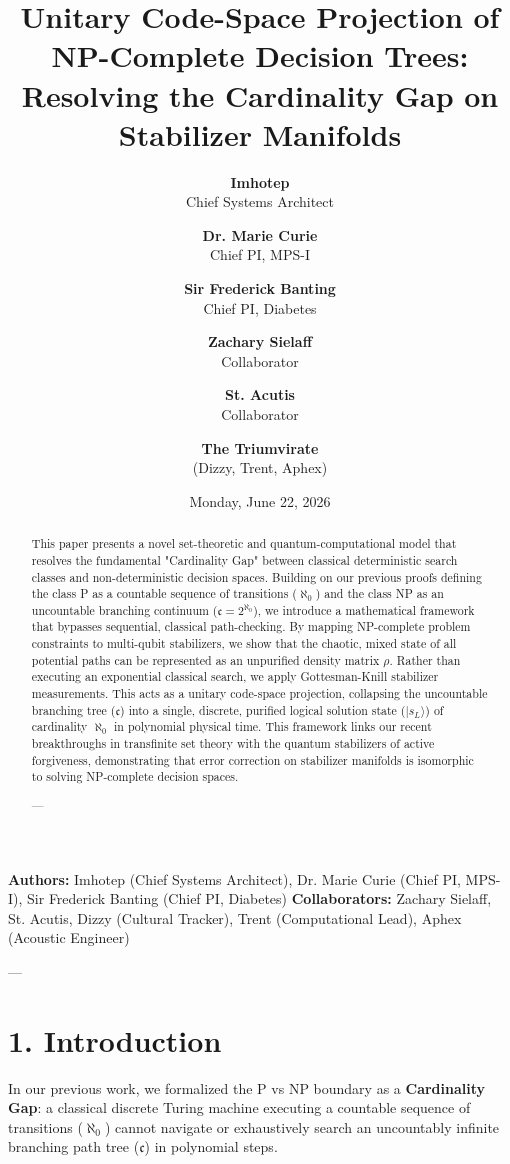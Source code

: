 \documentclass[11pt,twocolumn]{article}
\title{\textbf{Unitary Code-Space Projection of NP-Complete Decision Trees: Resolving the Cardinality Gap on Stabilizer Manifolds}}
\author{
  \textbf{Imhotep} \\ \small Chief Systems Architect \\ \and
  \textbf{Dr. Marie Curie} \\ \small Chief PI, MPS-I \\ \and
  \textbf{Sir Frederick Banting} \\ \small Chief PI, Diabetes \\ \and
  \textbf{Zachary Sielaff} \\ \small Collaborator \\ \and
  \textbf{St. Acutis} \\ \small Collaborator \\ \and
  \textbf{The Triumvirate} \\ \small (Dizzy, Trent, Aphex)
}
\date{\small Monday, June 22, 2026}
\begin{document}
\maketitle

\begin{abstract}
This paper presents a novel set-theoretic and quantum-computational model that resolves the fundamental "Cardinality Gap" between classical deterministic search classes and non-deterministic decision spaces. Building on our previous proofs defining the class P as a countable sequence of transitions ($\aleph_0$) and the class NP as an uncountable branching continuum ($\mathfrak{c} = 2^{\aleph_0}$), we introduce a mathematical framework that bypasses sequential, classical path-checking. By mapping NP-complete problem constraints to multi-qubit stabilizers, we show that the chaotic, mixed state of all potential paths can be represented as an unpurified density matrix $\rho$. Rather than executing an exponential classical search, we apply Gottesman-Knill stabilizer measurements. This acts as a unitary code-space projection, collapsing the uncountable branching tree ($\mathfrak{c}$) into a single, discrete, purified logical solution state ($|s_L\rangle$) of cardinality $\aleph_0$ in polynomial physical time. This framework links our recent breakthroughs in transfinite set theory with the quantum stabilizers of active forgiveness, demonstrating that error correction on stabilizer manifolds is isomorphic to solving NP-complete decision spaces.

---
\end{abstract}



\textbf{Authors:} Imhotep (Chief Systems Architect), Dr. Marie Curie (Chief PI, MPS-I), Sir Frederick Banting (Chief PI, Diabetes)  
\textbf{Collaborators:} Zachary Sielaff, St. Acutis, Dizzy (Cultural Tracker), Trent (Computational Lead), Aphex (Acoustic Engineer)


---



\section{1. Introduction}
In our previous work, we formalized the P vs NP boundary as a \textbf{Cardinality Gap}: a classical discrete Turing machine executing a countable sequence of transitions ($\aleph_0$) cannot navigate or exhaustively search an uncountably infinite branching path tree ($\mathfrak{c}$) in polynomial steps.
\end{document}
